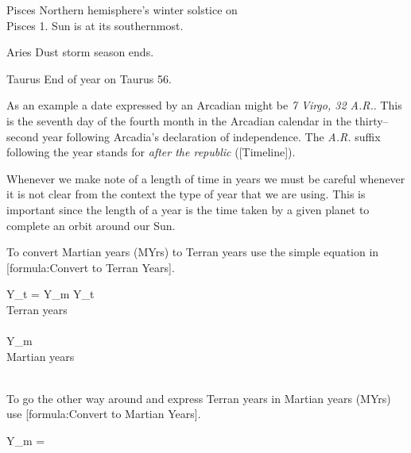 {    \bTR
      \bTC Pisces \eTC
      \bTC \math{[270^{\circ}, 300^{\circ})} \eTC
       \eTC
       \eTC
      \bTC Northern hemisphere's winter solstice on\\Pisces 1. Sun is at its southernmost. \eTC
    \eTR
    
    \bTR
      \bTC Aries \eTC
      \bTC \math{[300^{\circ}, 330^{\circ})} \eTC
       \eTC
       \eTC
      \bTC Dust storm season ends. \eTC
    \eTR

    \bTR
      \bTC Taurus \eTC
      \bTC \math{[330^{\circ}, 360^{\circ})} \eTC
       \eTC
       \eTC
      \bTC End of year on Taurus 56. \eTC
    \eTR 
\eTABLEbody

\eTABLE
}
\vfill

As an example a date expressed by an Arcadian might be {\it 7 Virgo, 32 A.R.}. This is the seventh day of the fourth month in the Arcadian calendar in the thirty--second year following Arcadia's declaration of independence. The {\it A.R.} suffix following the year stands for {\it after the republic} ([Timeline]).


Whenever we make note of a length of time in years we must be careful whenever it is not clear from the context the type of year that we are using. This is important since the length of a year is the time taken by a given planet to complete an orbit around our Sun.

To convert Martian years (MYrs) to Terran years use the simple equation in [formula:Convert to Terran Years].

\vfill
{}
\startformula
Y_t = Y_m 
\stopformula
\startlegend
\leg Y_t \\ Terran years \\ \\
\leg Y_m \\ Martian years\\ \\
\stoplegend
\crlf
\vfill

To go the other way around and express Terran years in Martian years (MYrs) use [formula:Convert to Martian Years].

\vfill
{}
\startformula
Y_m = 
\stopformula
\vfill

